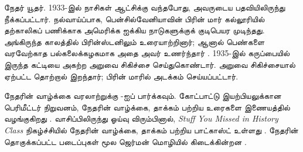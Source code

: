 \documentclass[../../../include/open-logic-section]{subfiles}
\begin{document}
நேதர் யூதர். 1933-இல் நாசிகள் ஆட்சிக்கு வந்தபோது, அவருடைய பதவியிலிருந்து
நீக்கப்பட்டார். நல்வாய்ப்பாக, பென்சில்வேனியாவின் பிரின் மார் கல்லூரியில்
தற்காலிகப் பணிக்காக அமெரிக்க ஐக்கிய நாடுகளுக்குக் குடிபெயர முடிந்தது.
அங்கிருந்த காலத்தில் பிரின்ஸ்டனிலும் உரையாற்றினார்; ஆனால் பெண்களை
வரவேற்காத பல்கலைக்கழகமாக அதை அவர் உணர்ந்தார் \citep[81]{Dick1981}.
1935-இல் கருப்பையில் இருந்த கட்டியை அகற்ற அறுவை சிகிச்சை செய்துகொண்டார்.
அறுவை சிகிச்சையால் ஏற்பட்ட தொற்றால் இறந்தார்; பிரின் மாரில் அடக்கம்
செய்யப்பட்டார்.

\begin{reading}
நேதரின் வாழ்க்கை வரலாற்றுக்கு \citet{Dick1981}-ஐப் பார்க்கவும்.
கோட்பாட்டு இயற்பியலுக்கான பெரிமீட்டர் நிறுவனம், நேதரின் வாழ்க்கை,
தாக்கம் பற்றிய உரைகளை இணையத்தில் வழங்குகிறது \citep{Perimeter2015}.
வாசிப்பிலிருந்து ஓய்வு விரும்பினால், \emph{Stuff You Missed in History
Class} நிகழ்ச்சியில் நேதரின் வாழ்க்கை, தாக்கம் பற்றிய பாட்காஸ்ட்
உள்ளது \citep{Frey2015}. நேதரின் தொகுக்கப்பட்ட படைப்புகள் மூல ஜெர்மன்
மொழியில் கிடைக்கின்றன \citep{Noether1983}.
\end{reading}
\end{document}
